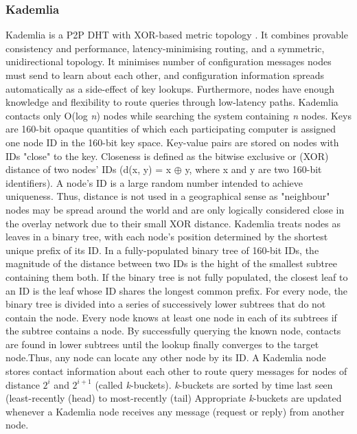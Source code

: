 \subsubsection{Kademlia}
Kademlia is a P2P DHT with XOR-based metric topology \cite{Maymounkov:2002:KPI:646334.687801}. It combines provable consistency and performance, latency-minimising routing, and a symmetric, unidirectional topology. It minimises number of configuration messages nodes must send to learn about each other, and configuration information spreads automatically as a side-effect of key lookups. Furthermore, nodes have enough knowledge and flexibility to route queries through low-latency paths.
Kademlia contacts only O(log \textit{n}) nodes while searching the system containing \textit{n} nodes. Keys are 160-bit opaque quantities of which each participating computer is assigned one node ID in the 160-bit key space. Key-value pairs are stored on nodes with IDs "close" to the key. Closeness is defined as the bitwise exclusive or (XOR) distance of two nodes' IDs (d(x, y) = x $\mathbin{\oplus}$ y, where x and y are two 160-bit identifiers). A node's ID is a large random number intended to achieve uniqueness. Thus, distance is not used in a geographical sense as "neighbour" nodes may be spread around the world and are only logically considered close in the overlay network due to their small XOR distance. Kademlia treats nodes as leaves in a binary tree, with each node's position determined by the shortest unique prefix of its ID. In a fully-populated binary tree of 160-bit IDs, the magnitude of the distance between two IDs is the hight of the smallest subtree containing them both. If the binary tree is not fully populated, the closest leaf to an ID is the leaf whose ID shares the longest common prefix. For every node, the binary tree is divided into a series of successively lower subtrees that do not contain the node. Every node knows at least one node in each of its subtrees if the subtree contains a node. By successfully querying the known node, contacts are found in lower subtrees until the lookup finally converges to the target node.Thus, any node can locate any other node by its ID.
A Kademlia node stores contact information about each other to route query messages for nodes of distance $2^i$ and $2^{i+1}$ (called \textit{k}-buckets). \textit{k}-buckets are sorted by time last seen (least-recently (head) to most-recently (tail) Appropriate \textit{k}-buckets are updated whenever a Kademlia node receives any message (request or reply) from another node. 


